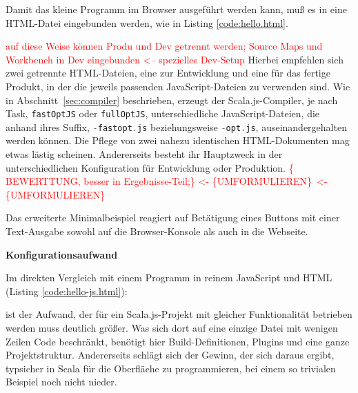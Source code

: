 \documentclass[a4paper, 12pt, hidelinks, listof=totoc, listoftables=totoc, bibliography=totoc]{scrreprt}
\newcommand{\code}[1]{\lstinline[language=Scala, style=inline]|#1|}
\newcommand{\TODO}[1]{\textcolor{red}{#1}\newline}
\newcommand{\TODOi}[1]{\textcolor{red}{\{#1\}}}
\newcommand{\REDOi}{\textcolor{red}{<- \{UMFORMULIEREN\}~}}
\newcommand{\MyMiniSec}[1]{\rmfamily\fontsize{12}{15}\selectfont
	\vspace{7pt}\textbf{#1} %
}
\begin{document}
Damit das kleine Programm im Browser ausgeführt werden kann, muß es in eine HTML-Datei eingebunden werden, wie in Listing \ref{code:hello.html}.




\TODO{auf diese Weise können Produ und Dev getrennt werden; Source Maps und Workbench in Dev eingebunden <-- spezielles Dev-Setup}
Hierbei empfehlen sich zwei getrennte HTML-Dateien, eine zur Entwicklung und eine für das fertige Produkt, in der die jeweils passenden JavaScript-Dateien zu verwenden sind. Wie in Abschnitt~\ref{sec:compiler} beschrieben, erzeugt der Scala.js-Compiler, je nach Task, \code{fastOptJS} oder \code{fullOptJS}, unterschiedliche JavaScript-Dateien, die anhand ihres Suffix, \code{-fastopt.js} beziehungsweise \code{-opt.js}, auseinandergehalten werden können. Die Pflege von zwei nahezu identischen HTML-Dokumenten mag etwas lästig scheinen. Andererseits besteht ihr Hauptzweck in der unterschiedlichen Konfiguration für Entwicklung oder Produktion. \TODOi{ BEWERTTUNG, besser in Ergebnisse-Teil;} \REDOi \REDOi

Das erweiterte Minimalbeispiel reagiert auf Betätigung eines Buttons mit einer Text-Ausgabe sowohl auf die Browser-Konsole als auch in die Webseite.


\MyMiniSec{Konfigurationsaufwand}

Im direkten Vergleich mit einem Programm in reinem JavaScript und HTML (Listing \ref{code:hello-js.html}):



ist der Aufwand, der für ein Scala.js-Projekt mit gleicher Funktionalität betrieben werden muss deutlich größer. Was sich dort auf eine einzige Datei mit wenigen Zeilen Code beschränkt, benötigt hier Build-Definitionen, Plugins und eine ganze Projektstruktur. Andererseits schlägt sich der Gewinn, der sich daraus ergibt, typsicher in Scala für die Oberfläche zu programmieren, bei einem so trivialen Beispiel noch nicht nieder.
\end{document}
